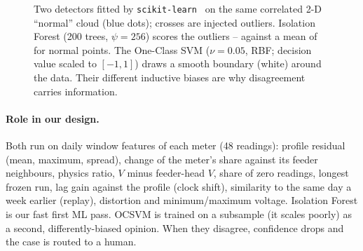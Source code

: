 \begin{figure}[H]
\centering
{}
\caption{Two detectors fitted by \texttt{scikit-learn}~\cite{sklearn} on the same correlated 2-D ``normal''
cloud (blue dots); crosses are injected outliers. Isolation Forest (200 trees, $\psi=256$) scores the outliers
\ifOutMin--\ifOutMax{} against a mean of \ifNormMean{} for normal points. The One-Class SVM ($\nu=0.05$, RBF;
decision value scaled to $[-1,1]$) draws a smooth boundary (white) around the data. Their different inductive
biases are why disagreement carries information.}
\label{g1-fig:maps}
\end{figure}

\paragraph{Role in our design.} Both run on daily window features of each meter (48 readings): profile residual
(mean, maximum, spread), change of the meter's share against its feeder neighbours, physics ratio, $V$ minus
feeder-head $V$, share of zero readings, longest frozen run, lag gain against the profile (clock shift),
similarity to the same day a week earlier (replay), distortion and minimum/maximum voltage. Isolation Forest is our fast first ML pass. OCSVM is trained on a
subsample (it scales poorly) as a second, differently-biased opinion. When they disagree, confidence drops
and the case is routed to a human.

